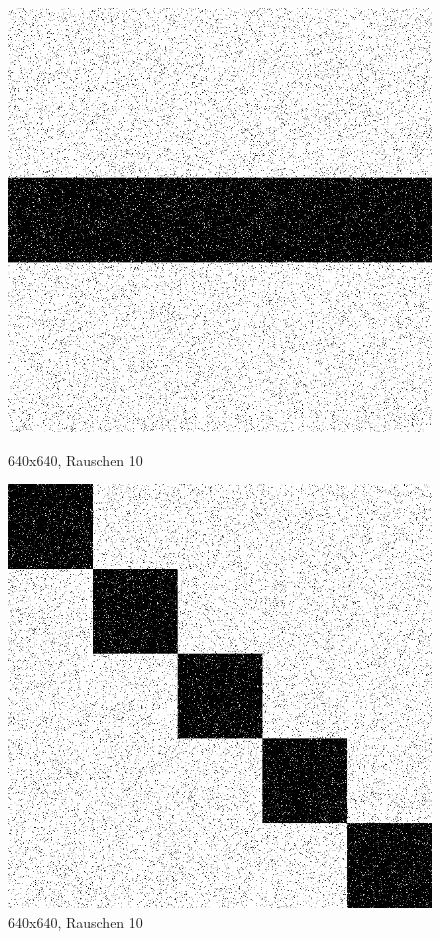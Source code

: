 \begin{figure}[hbt]
	\begin{minipage}{0.5 \textwidth}
		\includegraphics[width=\textwidth]{./Bilder/Auswertung/BeispielBilder/Picture_Line1_noise_10_pixelCnt_128_featureCnt_5}
		\caption{640x640, Rauschen 10}
	\end{minipage}
	\hfill
	\begin{minipage}{0.5 \textwidth}
		\includegraphics[width=\textwidth]{./Bilder/Auswertung/BeispielBilder/Picture_Line2_noise_10_pixelCnt_128_featureCnt_5}
		\caption{640x640, Rauschen 10}
	\end{minipage}
\end{figure}

